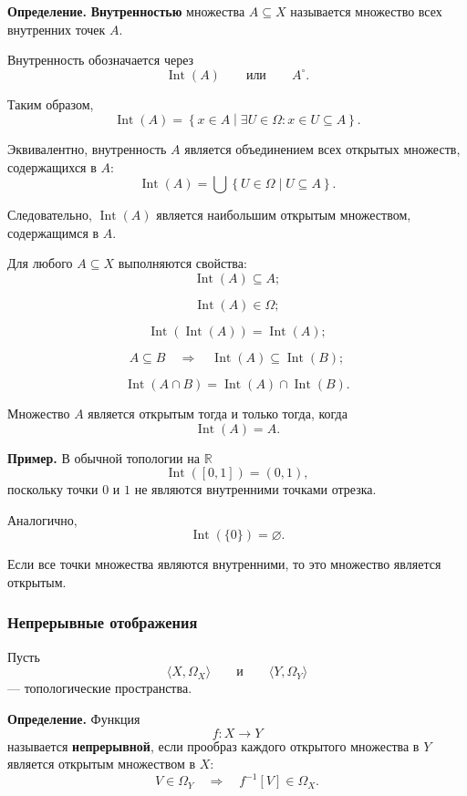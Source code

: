 \documentclass[12pt,a4paper,oneside,openany]{book}
\theoremstyle{definition}
\theoremstyle{plain}
\theoremstyle{remark}
\begin{document}
\textbf{Определение.}
\textbf{Внутренностью} множества \(A\subseteq X\) называется множество
всех внутренних точек \(A\).

Внутренность обозначается через
\[
\operatorname{Int}(A)
\qquad\text{или}\qquad
A^\circ.
\]

Таким образом,
\[
\operatorname{Int}(A)
=
\left\{
x\in A
\mathrel{}\middle|\mathrel{}
\exists U\in\Omega:
x\in U\subseteq A
\right\}.
\]

Эквивалентно, внутренность \(A\) является объединением всех открытых
множеств, содержащихся в \(A\):
\[
\operatorname{Int}(A)
=
\bigcup
\left\{
U\in\Omega
\mathrel{}\middle|\mathrel{}
U\subseteq A
\right\}.
\]

Следовательно, \(\operatorname{Int}(A)\) является наибольшим открытым
множеством, содержащимся в \(A\).

Для любого \(A\subseteq X\) выполняются свойства:
\[
\operatorname{Int}(A)\subseteq A;
\]

\[
\operatorname{Int}(A)\in\Omega;
\]

\[
\operatorname{Int}(\operatorname{Int}(A))
=
\operatorname{Int}(A);
\]

\[
A\subseteq B
\quad\Longrightarrow\quad
\operatorname{Int}(A)\subseteq\operatorname{Int}(B);
\]

\[
\operatorname{Int}(A\cap B)
=
\operatorname{Int}(A)\cap\operatorname{Int}(B).
\]

Множество \(A\) является открытым тогда и только тогда, когда
\[
\operatorname{Int}(A)=A.
\]

\textbf{Пример.}
В обычной топологии на \(\mathbb R\)
\[
\operatorname{Int}([0,1])=(0,1),
\]
поскольку точки \(0\) и \(1\) не являются внутренними точками
отрезка.

Аналогично,
\[
\operatorname{Int}(\{0\})=\varnothing.
\]

Если все точки множества являются
внутренними, то это множество является открытым.

\subsubsection{Непрерывные отображения}

Пусть
\[
\langle X,\Omega_X\rangle
\qquad\text{и}\qquad
\langle Y,\Omega_Y\rangle
\]
--- топологические пространства.

\textbf{Определение.}
Функция
\[
f:X\to Y
\]
называется \textbf{непрерывной}, если прообраз каждого открытого
множества в \(Y\) является открытым множеством в \(X\):
\[
V\in\Omega_Y
\quad\Longrightarrow\quad
f^{-1}[V]\in\Omega_X.
\]
\end{document}

